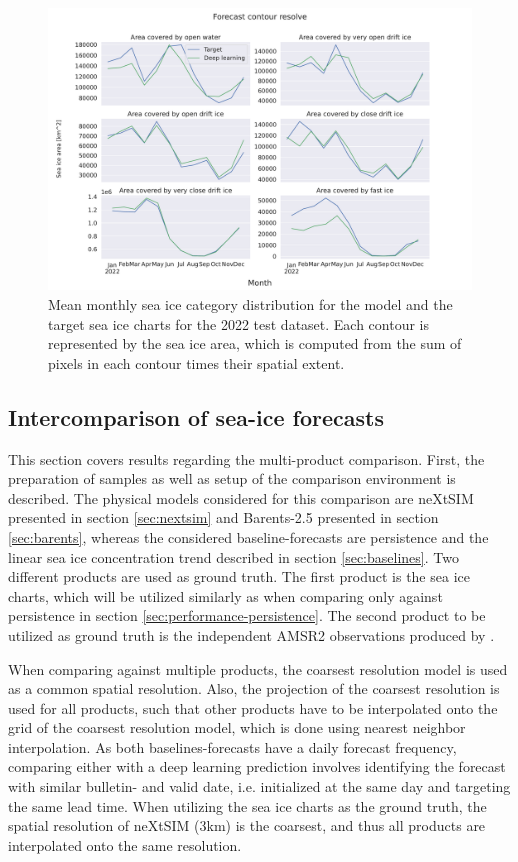 \documentclass[../main/thesis.tex]{subfiles}
\begin{document}
\begin{figure}
    \centering
    \includegraphics[width=\textwidth]{ice_contour_area}
    \caption{\label{fig:ice-contour-area}Mean monthly sea ice category distribution for the model and the target sea ice charts for the 2022 test dataset. Each contour is represented by the sea ice area, which is computed from the sum of pixels in each contour times their spatial extent.}
\end{figure}


\subsection{Intercomparison of sea-ice forecasts}
\label{sec:interproduct-compare}
This section covers results regarding the multi-product comparison. First, the preparation of samples as well as setup of the comparison environment is described. The physical models considered for this comparison are neXtSIM \citep{Williams2021} presented in section \ref{sec:nextsim} and Barents-2.5 \citep{Roehrs2022} presented in section \ref{sec:barents}, whereas the considered baseline-forecasts are persistence and the linear sea ice concentration trend described in section \ref{sec:baselines}. Two different products are used as ground truth. The first product is the sea ice charts, which will be utilized similarly as when comparing only against persistence in section \ref{sec:performance-persistence}. The second product to be utilized as ground truth is the independent AMSR2 observations produced by \citet{Spreen2008}.

When comparing against multiple products, the coarsest resolution model is used as a common spatial resolution. Also, the projection of the coarsest resolution is used for all products, such that other products have to be interpolated onto the grid of the coarsest resolution model, which is done using nearest neighbor interpolation. As both baselines-forecasts have a daily forecast frequency, comparing either with a deep learning prediction involves identifying the forecast with similar bulletin- and valid date, i.e. initialized at the same day and targeting the same lead time. When utilizing the sea ice charts as the ground truth, the spatial resolution of neXtSIM (3km) is the coarsest, and thus all products are interpolated onto the same resolution.
\end{document}
